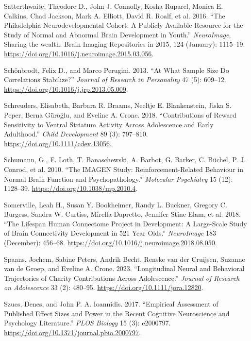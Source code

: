 \documentclass[
  letterpaper,
  DIV=11,
  numbers=noendperiod]{scrartcl}
\newlength{\cslhangindent}
\newenvironment{CSLReferences}[2] %
 {\begin{list}{}{%
  \setlength{\itemindent}{0pt}
  \setlength{\leftmargin}{0pt}
  \setlength{\parsep}{0pt}
  \ifodd #1
   \setlength{\leftmargin}{\cslhangindent}
   \setlength{\itemindent}{-1\cslhangindent}
  \fi
  \setlength{\itemsep}{#2\baselineskip}}}
 {\end{list}}
\begin{document}
\begin{CSLReferences}{1}{0}
Satterthwaite, Theodore D., John J. Connolly, Kosha Ruparel, Monica E.
Calkins, Chad Jackson, Mark A. Elliott, David R. Roalf, et al. 2016.
{``The Philadelphia Neurodevelopmental Cohort: A Publicly Available
Resource for the Study of Normal and Abnormal Brain Development in
Youth.''} \emph{NeuroImage}, Sharing the wealth: Brain Imaging
Repositories in 2015, 124 (January): 1115--19.
\url{https://doi.org/10.1016/j.neuroimage.2015.03.056}.

Schönbrodt, Felix D., and Marco Perugini. 2013. {``At What Sample Size
Do Correlations Stabilize?''} \emph{Journal of Research in Personality}
47 (5): 609--12. \url{https://doi.org/10.1016/j.jrp.2013.05.009}.

Schreuders, Elisabeth, Barbara R. Braams, Neeltje E. Blankenstein, Jiska
S. Peper, Berna Güroğlu, and Eveline A. Crone. 2018. {``Contributions of
Reward Sensitivity to Ventral Striatum Activity Across Adolescence and
Early Adulthood.''} \emph{Child Development} 89 (3): 797--810.
\url{https://doi.org/10.1111/cdev.13056}.

Schumann, G., E. Loth, T. Banaschewski, A. Barbot, G. Barker, C. Büchel,
P. J. Conrod, et al. 2010. {``The IMAGEN Study: Reinforcement-Related
Behaviour in Normal Brain Function and Psychopathology.''}
\emph{Molecular Psychiatry} 15 (12): 1128--39.
\url{https://doi.org/10.1038/mp.2010.4}.

Somerville, Leah H., Susan Y. Bookheimer, Randy L. Buckner, Gregory C.
Burgess, Sandra W. Curtiss, Mirella Dapretto, Jennifer Stine Elam, et
al. 2018. {``The Lifespan Human Connectome Project in Development: A
Large-Scale Study of Brain Connectivity Development in 5{\textendash}21
Year Olds.''} \emph{NeuroImage} 183 (December): 456--68.
\url{https://doi.org/10.1016/j.neuroimage.2018.08.050}.

Spaans, Jochem, Sabine Peters, Andrik Becht, Renske van der Cruijsen,
Suzanne van de Groep, and Eveline A. Crone. 2023. {``Longitudinal Neural
and Behavioral Trajectories of Charity Contributions Across
Adolescence.''} \emph{Journal of Research on Adolescence} 33 (2):
480--95. \url{https://doi.org/10.1111/jora.12820}.

Szucs, Denes, and John P. A. Ioannidis. 2017. {``Empirical Assessment of
Published Effect Sizes and Power in the Recent Cognitive Neuroscience
and Psychology Literature.''} \emph{PLOS Biology} 15 (3): e2000797.
\url{https://doi.org/10.1371/journal.pbio.2000797}.


\end{CSLReferences}
\end{document}
